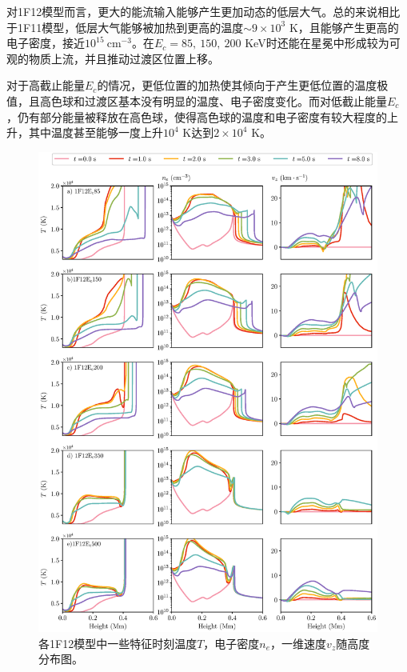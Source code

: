 对1F12模型而言，更大的能流输入能够产生更加动态的低层大气。总的来说相比于1F11模型，低层大气能够被加热到更高的温度$\sim 9\times 10^{3}$ K，且能够产生更高的电子密度，接近$10^{15}\ \mathrm{cm^{-3}}$。在$E_c = 85,\ 150 ,\ 200$ KeV时还能在星冕中形成较为可观的物质上流，并且推动过渡区位置上移。

对于高截止能量$E_c$的情况，更低位置的加热使其倾向于产生更低位置的温度极值，且高色球和过渡区基本没有明显的温度、电子密度变化。而对低截止能量$E_c$，仍有部分能量被释放在高色球，使得高色球的温度和电子密度有较大程度的上升，其中温度甚至能够一度上升$10^4$ K达到$2\times 10^4$ K。

\begin{figure}
	\centering
	\includegraphics[width=\textwidth]{figs/dMe_atoms_2}
	\caption{各1F12模型中一些特征时刻温度$T$，电子密度$n_e$，一维速度$v_z$随高度分布图。}
	\label{fig:4.2}
\end{figure}

